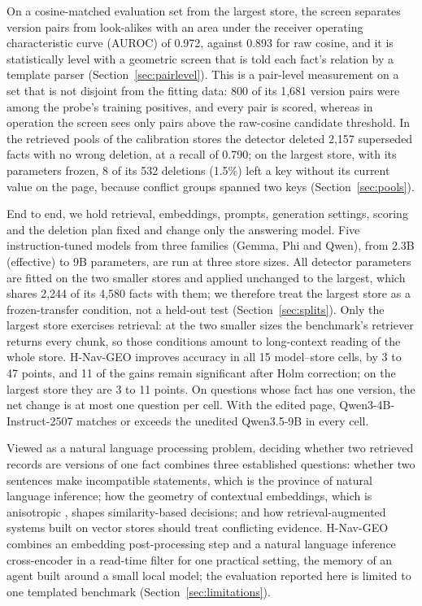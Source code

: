 \documentclass{CUP-JNL-NLP}
\newcommand{\geo}{H-Nav-GEO}
\begin{document}
On a cosine-matched evaluation set from the largest store, the screen separates version pairs from look-alikes with an area under the receiver operating characteristic curve (AUROC) of 0.972, against 0.893 for raw cosine, and it is statistically level with a geometric screen that is told each fact's relation by a template parser (Section~\ref{sec:pairlevel}). This is a pair-level measurement on a set that is not disjoint from the fitting data: 800 of its 1,681 version pairs were among the probe's training positives, and every pair is scored, whereas in operation the screen sees only pairs above the raw-cosine candidate threshold. In the retrieved pools of the calibration stores the detector deleted 2,157 superseded facts with no wrong deletion, at a recall of 0.790; on the largest store, with its parameters frozen, 8 of its 532 deletions (1.5\%) left a key without its current value on the page, because conflict groups spanned two keys (Section~\ref{sec:pools}).

End to end, we hold retrieval, embeddings, prompts, generation settings, scoring and the deletion plan fixed and change only the answering model. Five instruction-tuned models from three families (Gemma, Phi and Qwen), from 2.3B (effective) to 9B parameters, are run at three store sizes. All detector parameters are fitted on the two smaller stores and applied unchanged to the largest, which shares 2,244 of its 4,580 facts with them; we therefore treat the largest store as a frozen-transfer condition, not a held-out test (Section~\ref{sec:splits}). Only the largest store exercises retrieval: at the two smaller sizes the benchmark's retriever returns every chunk, so those conditions amount to long-context reading of the whole store. \geo{} improves accuracy in all 15 model--store cells, by 3 to 47 points, and 11 of the gains remain significant after Holm correction; on the largest store they are 3 to 11 points. On questions whose fact has one version, the net change is at most one question per cell. With the edited page, Qwen3-4B-Instruct-2507 matches or exceeds the unedited Qwen3.5-9B in every cell.

Viewed as a natural language processing problem, deciding whether two retrieved records are versions of one fact combines three established questions: whether two sentences make incompatible statements, which is the province of natural language inference; how the geometry of contextual embeddings, which is anisotropic \citep{ethayarajh2019contextual}, shapes similarity-based decisions; and how retrieval-augmented systems built on vector stores \citep{church2024emerging} should treat conflicting evidence. \geo{} combines an embedding post-processing step and a natural language inference cross-encoder in a read-time filter for one practical setting, the memory of an agent built around a small local model; the evaluation reported here is limited to one templated benchmark (Section~\ref{sec:limitations}).
\end{document}
